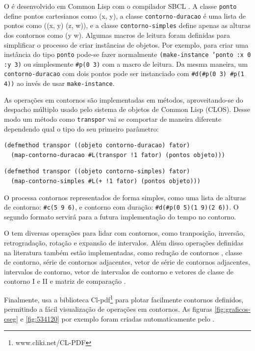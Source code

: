 O \goiaba{} é desenvolvido em Common Lisp com o compilador SBCL
\cite{team07:sbcl}.
A classe \texttt{ponto} define pontos cartesianos como (x, y), a
classe \texttt{contorno-duracao} é uma lista de pontos como ((x, y)
(z, w)), e a classe \texttt{contorno-simples} define apenas as alturas
dos contornos como (y w). Algumas macros de leitura foram definidas
para simplificar o processo de criar instâncias de objetos. Por
exemplo, para criar uma instância do tipo \texttt{ponto} pode-se fazer
normalmente \texttt{(make-instance 'ponto :x 0 :y 3)} ou simplesmente
\verb!#p(0 3)! com a macro de leitura. Da mesma maneira, um
\texttt{contorno-duracao} com dois pontos pode ser instanciado com
\verb!#d(#p(0 3) #p(1 4))! ao invés de usar \texttt{make-instance}.

As operações em contornos são implementadas em métodos,
aproveitando-se do despacho múltiplo usado pelo sistema de objetos de
Common Lisp (CLOS). Desse modo um método como \texttt{transpor} vai se
comportar de maneira diferente dependendo qual o tipo do seu primeiro
parâmetro:

\begin{verbatim}
(defmethod transpor ((objeto contorno-duracao) fator)
  (map-contorno-duracao #L(transpor !1 fator) (pontos objeto)))
\end{verbatim}

\begin{verbatim}
(defmethod transpor ((objeto contorno-simples) fator)
  (map-contorno-simples #L(+ !1 fator) (pontos objeto)))
\end{verbatim}

O \goiaba{} processa contornos representados de forma simples, como
uma lista de alturas de contorno: \verb!#c(5 9 6)!, e contorno com
duração: \verb!#d(#p(0 5)(1 9)(2 6))!. O segundo formato servirá para
a futura implementação do tempo no contorno.

O \goiaba{} tem diversas operações para lidar com contornos, como
tranposição, inversão, retrogradação, rotação e expansão de
intervalos. Além disso operações definidas na literatura também estão
implementadas, como redução de contornos \cite{adams76:melodic},
classe de contorno, série de contornos adjacentes, vetor de série de
contornos adjacentes, intervalos de contorno, vetor de intervalos de
contorno e vetores de classe de contorno I e II
\cite{friedmann85:methodology} e matriz de comparação
\cite{morris93:directions}.

Finalmente, \goiaba{} usa a biblioteca
Cl-pdf\footnote{www.cliki.net/CL-PDF} para plotar facilmente contornos
definidos, permitindo a fácil visualização de operações em
contornos. As figuras \ref{fig:graficos-cseg} e \ref{fig:534120} por
exemplo foram criadas automaticamente pelo \goiaba{}.

